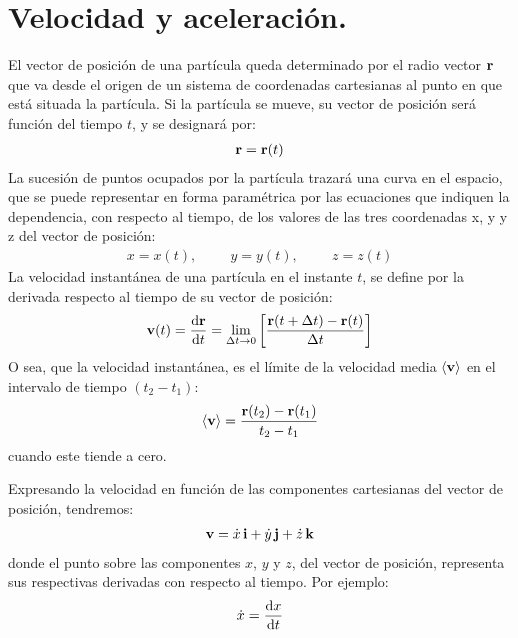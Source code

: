 \section{Velocidad y aceleración.} 

El vector de posición de una partícula queda determinado por el radio vector $\vb{r}$ que va desde el origen de un sistema de coordenadas cartesianas al punto en que está situada la partícula. Si la partícula se mueve, su vector de posición será función del tiempo $t$, y se designará por:
\begin{align}
\vb{r} = \vb{r} (t)
\label{eq:ecuacion_02_01} 
\end{align}
La sucesión de puntos ocupados por la partícula trazará una curva en el espacio, que se puede representar en forma paramétrica por las ecuaciones que indiquen la dependencia, con respecto al tiempo, de los valores de las tres coordenadas x, y y z del vector de posición: 
\begin{align}
x = x (t), \hspace{1cm} y = y (t), \hspace{1cm} z = z (t)
\label{eq:ecuacion_02_02} 
\end{align}
La velocidad instantánea de una partícula en el instante $t$, se define por la derivada respecto al tiempo de su vector de posición:
\begin{align}
\vb{v} (t) = \dv{\vb{r}}{t} = \lim_{\Delta t \to 0} \left[ \dfrac{\vb{r} (t + \Delta t) - \vb{r} (t)}{\Delta t} \right]
\label{eq:ecuacion_02_03} 
\end{align}
O sea, que la velocidad instantánea, es el límite de la velocidad media $\expval{\vb{v}}$ en el intervalo de tiempo $(t_{2} - t_{1})$:
\begin{align}
\expval{\vb{v}} = \dfrac{\vb{r} (t_{2}) - \vb{r} (t_{1})}{t_{2} - t_{1}}
\label{eq:ecuacion_02_04} 
\end{align}
cuando este tiende a cero.
\par
Expresando la velocidad en función de las componentes cartesianas del vector de posición, tendremos:
\begin{align}
\vb{v} = \dot{x} \, \vb{i} + \dot{y} \, \vb{j} + \dot{z} \, \vb{k}
\label{eq:ecuacion_02_05}
\end{align}
donde el punto sobre las componentes $x$, $y$ y $z$, del vector de posición, representa sus respectivas derivadas con respecto al tiempo. Por ejemplo:
\begin{align*}
\dot{x} = \dv{x}{t}
\end{align*}
